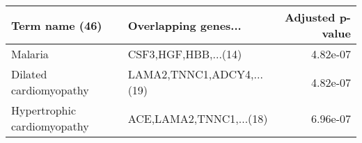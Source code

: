 \begin{tabular}{llr}
\toprule
             Term name (46) &      Overlapping genes... &  Adjusted p-value \\
\midrule
                    Malaria &      CSF3,HGF,HBB,...(14) &          4.82e-07 \\
     Dilated cardiomyopathy & LAMA2,TNNC1,ADCY4,...(19) &          4.82e-07 \\
Hypertrophic cardiomyopathy &   ACE,LAMA2,TNNC1,...(18) &          6.96e-07 \\
\bottomrule
\end{tabular}
